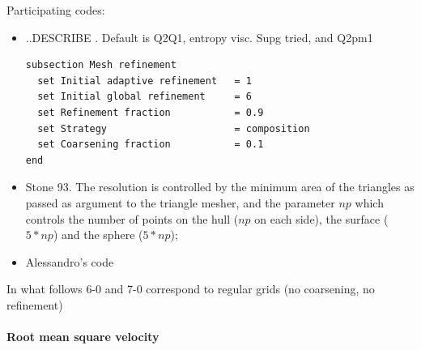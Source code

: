Participating codes:
\begin{itemize}
\item \aspect ..DESCRIBE . Default is Q2Q1, entropy visc. Supg tried, and Q2pm1
\begin{lstlisting}
subsection Mesh refinement
  set Initial adaptive refinement   = 1 
  set Initial global refinement     = 6 
  set Refinement fraction           = 0.9 
  set Strategy                      = composition
  set Coarsening fraction           = 0.1 
end
\end{lstlisting}


 
\item Stone 93. The resolution is controlled by the minimum area of 
the triangles as passed as argument to the triangle mesher, and the parameter $np$ which controls
the number of points on the hull ($np$ on each side), the surface ($5*np$) and the sphere ($5*np$);
\item Alessandro's code
\end{itemize}

In what follows 6-0 and 7-0 correspond to regular grids (no coarsening, no refinement) 

\newpage
\paragraph{Root mean square velocity}

